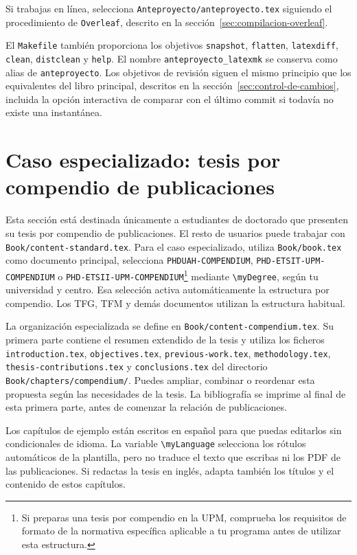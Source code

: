 Si trabajas en línea, selecciona \texttt{Anteproyecto/anteproyecto.tex} siguiendo el procedimiento de \texttt{Overleaf}, descrito en la sección~\ref{sec:compilacion-overleaf}.

El \texttt{Makefile} también proporciona los objetivos \texttt{snapshot}, \texttt{flatten}, \texttt{latexdiff}, \texttt{clean}, \texttt{distclean} y \texttt{help}. El nombre \texttt{anteproyecto\_latexmk} se conserva como alias de \texttt{anteproyecto}. Los objetivos de revisión siguen el mismo principio que los equivalentes del libro principal, descritos en la sección~\ref{sec:control-de-cambios}, incluida la opción interactiva de comparar con el último commit si todavía no existe una instantánea.

\section{Caso especializado: tesis por compendio de publicaciones}
\label{sec:tesis-compendio}

Esta sección está destinada únicamente a estudiantes de doctorado que presenten su tesis por compendio de publicaciones. El resto de usuarios puede trabajar con \texttt{Book/content-standard.tex}. Para el caso especializado, utiliza \texttt{Book/book.tex} como documento principal, selecciona \texttt{PHDUAH-COMPENDIUM}, \texttt{PHD-ETSIT-UPM-COMPENDIUM} o \texttt{PHD-ETSII-UPM-COMPENDIUM}\footnote{Si preparas una tesis por compendio en la UPM, comprueba los requisitos de formato de la normativa específica aplicable a tu programa antes de utilizar esta estructura.} mediante \texttt{\textbackslash{}myDegree}, según tu universidad y centro. Esa selección activa automáticamente la estructura por compendio. Los TFG, TFM y demás documentos utilizan la estructura habitual.

La organización especializada se define en \texttt{Book/content-compendium.tex}. Su primera parte contiene el resumen extendido de la tesis y utiliza los ficheros \texttt{introduction.tex}, \texttt{objectives.tex}, \texttt{previous-work.tex}, \texttt{methodology.tex}, \texttt{thesis-contributions.tex} y \texttt{conclusions.tex} del directorio \texttt{Book/chapters/compendium/}. Puedes ampliar, combinar o reordenar esta propuesta según las necesidades de la tesis. La bibliografía se imprime al final de esta primera parte, antes de comenzar la relación de publicaciones.

Los capítulos de ejemplo están escritos en español para que puedas editarlos sin condicionales de idioma. La variable \texttt{\textbackslash{}myLanguage} selecciona los rótulos automáticos de la plantilla, pero no traduce el texto que escribas ni los PDF de las publicaciones. Si redactas la tesis en inglés, adapta también los títulos y el contenido de estos capítulos.


